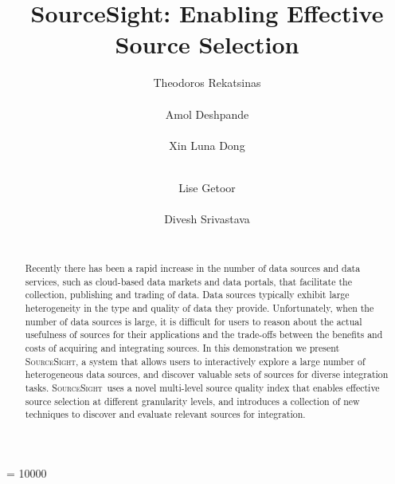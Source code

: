 \documentclass{sig-alternate-05-2015}
\newcommand\system{\textsc{SourceSight}}
\begin{document}
 

\widowpenalty = 10000

\title{SourceSight: Enabling Effective Source Selection}


\author{
\alignauthor
Theodoros Rekatsinas\\
       \\
\alignauthor
Amol Deshpande\\
       \\
\alignauthor 
Xin Luna Dong\\
       \\
\and  %
\alignauthor 
Lise Getoor\\
       \\
\alignauthor Divesh Srivastava\\
       \\
}

\maketitle

\begin{abstract}
Recently there has been a rapid increase in the number of data sources and data services, such as cloud-based data markets and data portals, that facilitate the collection, publishing and trading of data. Data sources typically exhibit large heterogeneity in the type and quality of data they provide. Unfortunately, when the number of data sources is large, it is difficult for users to reason about the actual usefulness of sources for their applications and the trade-offs between the benefits and costs of acquiring and integrating sources. In this demonstration we present \system, a system that allows users to interactively explore a large number of heterogeneous data sources, and discover valuable sets of sources for diverse integration tasks. \system~uses a novel multi-level source quality index that enables effective source selection at different granularity levels, and introduces a collection of new techniques to discover and evaluate relevant sources for integration.
\end{abstract}
\end{document}
